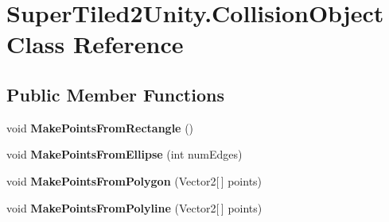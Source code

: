 \hypertarget{class_super_tiled2_unity_1_1_collision_object}{}\section{Super\+Tiled2\+Unity.\+Collision\+Object Class Reference}
\label{class_super_tiled2_unity_1_1_collision_object}
\subsection*{Public Member Functions}
\begin{DoxyCompactItemize}
\item 
\mbox{\label{class_super_tiled2_unity_1_1_collision_object_a749cec1aeb1550729db88470c35867a3}} 
void {\bfseries Make\+Points\+From\+Rectangle} ()
\item 
\mbox{\label{class_super_tiled2_unity_1_1_collision_object_adc1bfcaef9381cd5ff606bb5f48cba95}} 
void {\bfseries Make\+Points\+From\+Ellipse} (int num\+Edges)
\item 
\mbox{\label{class_super_tiled2_unity_1_1_collision_object_aea4f700c9c27b96b23a6f43d4ed9a2e1}} 
void {\bfseries Make\+Points\+From\+Polygon} (Vector2\mbox{[}$\,$\mbox{]} points)
\item 
\mbox{\label{class_super_tiled2_unity_1_1_collision_object_a99a30c721cb3f62fcaa33c7f720b592b}} 
void {\bfseries Make\+Points\+From\+Polyline} (Vector2\mbox{[}$\,$\mbox{]} points)
\end{DoxyCompactItemize}
